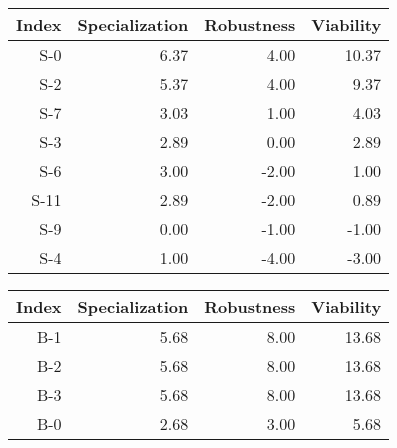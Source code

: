 


\begin{tabular}{ | r | r | r | r | }
    \hline
                 Index  &  Specialization  &      Robustness  &       Viability  \\
    \hline
    \hline
                   S-0  &            6.37  &            4.00  &           10.37  \\
    \hline
                   S-2  &            5.37  &            4.00  &            9.37  \\
    \hline
                   S-7  &            3.03  &            1.00  &            4.03  \\
    \hline
                   S-3  &            2.89  &            0.00  &            2.89  \\
    \hline
                   S-6  &            3.00  &           -2.00  &            1.00  \\
    \hline
                  S-11  &            2.89  &           -2.00  &            0.89  \\
    \hline
                   S-9  &            0.00  &           -1.00  &           -1.00  \\
    \hline
                   S-4  &            1.00  &           -4.00  &           -3.00  \\
    \hline
\end{tabular}


\begin{tabular}{ | r | r | r | r | }
    \hline
                 Index  &  Specialization  &      Robustness  &       Viability  \\
    \hline
    \hline
                   B-1  &            5.68  &            8.00  &           13.68  \\
    \hline
                   B-2  &            5.68  &            8.00  &           13.68  \\
    \hline
                   B-3  &            5.68  &            8.00  &           13.68  \\
    \hline
                   B-0  &            2.68  &            3.00  &            5.68  \\
    \hline
\end{tabular}


